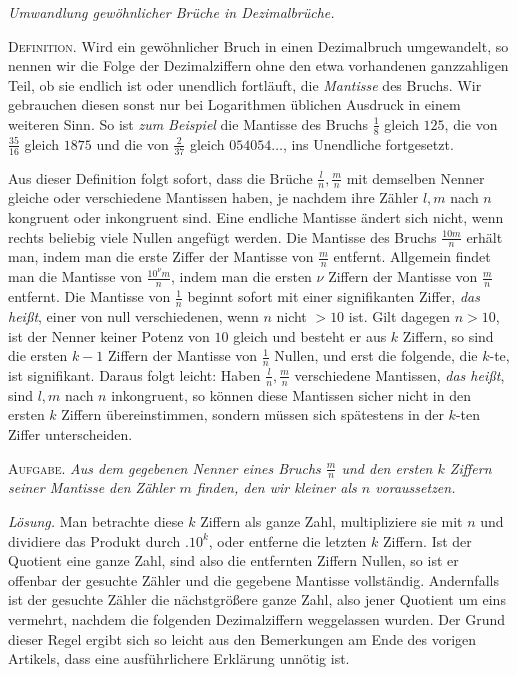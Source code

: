 \begin{center}\textit{Umwandlung gewöhnlicher Brüche in Dezimalbrüche.}\end{center}

\textsc{Definition.} Wird ein gewöhnlicher Bruch in einen Dezimalbruch umgewandelt, so nennen wir die Folge der Dezimalziffern ohne den etwa vorhandenen ganzzahligen Teil, ob sie endlich ist oder unendlich fortläuft, die \textit{Mantisse} des Bruchs. Wir gebrauchen diesen sonst nur bei Logarithmen üblichen Ausdruck in einem weiteren Sinn. So ist \textit{zum Beispiel} die Mantisse des Bruchs \(\frac18\) gleich \(125\), die von \(\frac{35}{16}\) gleich \(1875\) und die von \(\frac2{37}\) gleich \(054054\ldots\), ins Unendliche fortgesetzt.

Aus dieser Definition folgt sofort, dass die Brüche \(\frac ln,\frac mn\) mit demselben Nenner gleiche oder verschiedene Mantissen haben, je nachdem ihre Zähler \(l,m\) nach \(n\) kongruent oder inkongruent sind. Eine endliche Mantisse ändert sich nicht, wenn rechts beliebig viele Nullen angefügt werden. Die Mantisse des Bruchs \(\frac{10m}{n}\) erhält man, indem man die erste Ziffer der Mantisse von \(\frac mn\) entfernt. Allgemein findet man die Mantisse von \(\frac{10^\nu m}{n}\), indem man die ersten \(\nu\) Ziffern der Mantisse von \(\frac mn\) entfernt. Die Mantisse von \(\frac1n\) beginnt sofort mit einer signifikanten Ziffer, \textit{das heißt}, einer von null verschiedenen, wenn \(n\) nicht \(>10\) ist. Gilt dagegen \(n>10\), ist der Nenner keiner Potenz von \(10\) gleich und besteht er aus \(k\) Ziffern, so sind die ersten \(k-1\) Ziffern der Mantisse von \(\frac1n\) Nullen, und erst die folgende, die \(k\)-te, ist signifikant. Daraus folgt leicht: Haben \(\frac ln,\frac mn\) verschiedene Mantissen, \textit{das heißt},
sind \(l,m\) nach \(n\) inkongruent, so können diese Mantissen sicher nicht in den ersten \(k\) Ziffern übereinstimmen, sondern müssen sich spätestens in der \(k\)-ten Ziffer unterscheiden.

\textsc{Aufgabe.} \textit{Aus dem gegebenen Nenner eines Bruchs \(\frac mn\) und den ersten \(k\) Ziffern seiner Mantisse den Zähler \(m\) finden, den wir kleiner als \(n\) voraussetzen.}

\textit{Lösung.} Man betrachte diese \(k\) Ziffern als ganze Zahl, multipliziere sie mit \(n\) und dividiere das Produkt durch \(.10^k\), oder entferne die letzten \(k\) Ziffern. Ist der Quotient eine ganze Zahl, sind also die entfernten Ziffern Nullen, so ist er offenbar der gesuchte Zähler und die gegebene Mantisse vollständig. Andernfalls ist der gesuchte Zähler die nächstgrößere ganze Zahl, also jener Quotient um eins vermehrt, nachdem die folgenden Dezimalziffern weggelassen wurden. Der Grund dieser Regel ergibt sich so leicht aus den Bemerkungen am Ende des vorigen Artikels, dass eine ausführlichere Erklärung unnötig ist.

